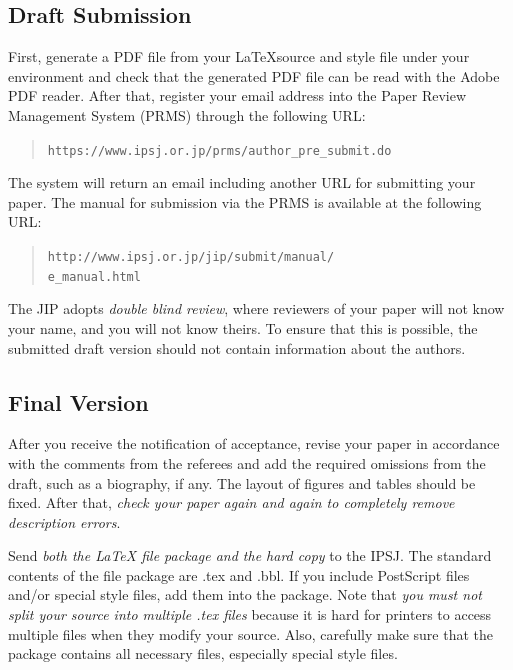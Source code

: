 \documentclass[submit,ses,english]{ipsj-lualatex} %
\def\|{\verb|}
\begin{document}

%2.2
\subsection{Draft Submission}

First, generate a PDF file from your \LaTeX source and style file under
your {\LaTeXe} environment and check that the generated PDF file can be
read with the Adobe PDF reader.  After that, register your email address
into the Paper Review Management System (PRMS) through the following
URL:
\begin{quote}
 \small
 \|https://www.ipsj.or.jp/prms/author_pre_submit.do|
\end{quote}

\noindent
The system will return an email including another URL for submitting
your paper. The manual for submission via the PRMS is available at the
following URL: 
\begin{quote}
 \small
 \|http://www.ipsj.or.jp/jip/submit/manual/|\\
 \|e_manual.html|
\end{quote}

The JIP adopts \textit{double blind review}, where reviewers of your
paper will not know your name, and you will not know theirs.  To ensure
that this is possible, the submitted draft version should not contain
information about the authors.

\subsection{Final Version}

After you receive the notification of acceptance, revise your paper in
accordance with the comments from the referees and add the required
omissions from the draft, such as a biography, if any. The layout of
figures and tables should be fixed. After that, \textit{check your paper
again and again to completely remove description errors}.

Send \textit{both the {\LaTeX} file package and the hard copy} to the
IPSJ\@. The standard contents of the file package are .tex and .bbl. If
you include PostScript files and/or special style files, add them into
the package. Note that \textit{you must not split your source into
multiple .tex files} because it is hard for printers to access multiple
files when they modify your source. Also, carefully make sure that the
package contains all necessary files, especially special style files.
\end{document}
